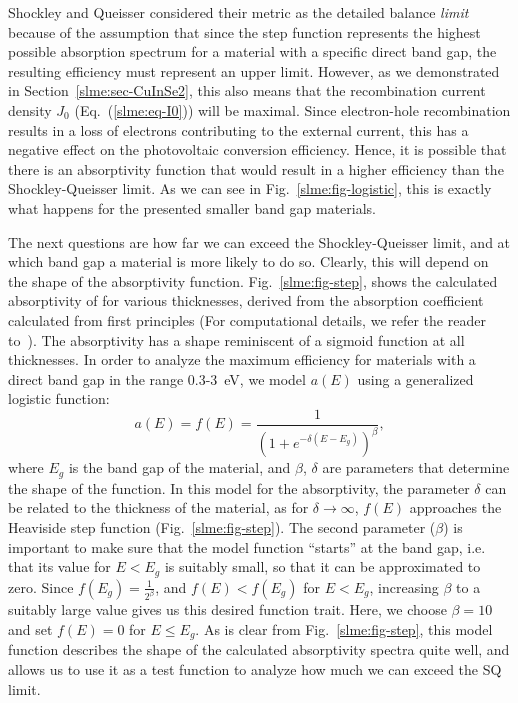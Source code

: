 \begin{refsection}
Shockley and Queisser considered their metric as the detailed balance 
\textit{limit} because of the assumption that since the step function 
represents the highest possible absorption spectrum for a material with a 
specific direct band gap, the resulting efficiency must represent an upper 
limit. However, as we demonstrated in Section~\ref{slme:sec-CuInSe2}, this 
also means that the recombination current density $J_0$ 
(Eq.~(\ref{slme:eq-I0})) will be maximal. Since electron-hole recombination 
results in a loss of electrons contributing to the external current, this has 
a negative effect on the photovoltaic conversion efficiency. Hence, it is 
possible that there is an absorptivity function that would result in a higher 
efficiency than the Shockley-Queisser limit. As we can see in 
Fig.~\ref{slme:fig-logistic}, this is exactly what happens for the presented 
smaller band gap materials. 
 
The next questions are how far we can exceed the Shockley-Queisser limit, and 
at which band gap a material is more likely to do so. Clearly, this will 
depend on the shape of the absorptivity function. Fig.~\ref{slme:fig-step}, 
shows the calculated absorptivity of  for various thicknesses, 
derived from the absorption coefficient calculated from first principles (For 
computational details, we refer the reader to~\cite{Sarmadian2016}). 
The absorptivity has a shape reminiscent of a sigmoid function at all thicknesses. In 
order to analyze the maximum efficiency for materials with a direct band gap 
in the range 0.3-3~\si{\electronvolt}, we model $a(E)$ using a generalized 
logistic function: 
\begin{equation} 
a(E) = f(E) = \frac{1}{(1+e^{-\delta (E - E_g)})^{\beta}}, 
\end{equation} 
where $E_g$ is the band gap of the material, and $\beta$, $\delta$ are 
parameters that determine the shape of the function. In this model for the 
absorptivity, the parameter $\delta$ can be related to the thickness of the 
material, as for $\delta\rightarrow\infty$, $f(E)$ approaches the Heaviside 
step function (Fig.~\ref{slme:fig-step}). The second parameter ($\beta$) is 
important to make sure that the model function ``starts'' at the band gap, 
i.e. that its value for $E < E_g$ is suitably small, so that it can be 
approximated to zero. Since $f(E_g) = \frac{1}{2^\beta}$, and $f(E) < f(E_g)$ 
for $E < E_g$, increasing $\beta$ to a suitably large value gives us this 
desired function trait. Here, we choose $\beta = 10$ and set $f(E) = 0$ for $E 
\leq E_g$. As is clear from Fig.~\ref{slme:fig-step}, this model function 
describes the shape of the calculated absorptivity spectra quite well, and 
allows us to use it as a test function to analyze how much we can exceed the 
SQ limit. 
 

\end{refsection}
